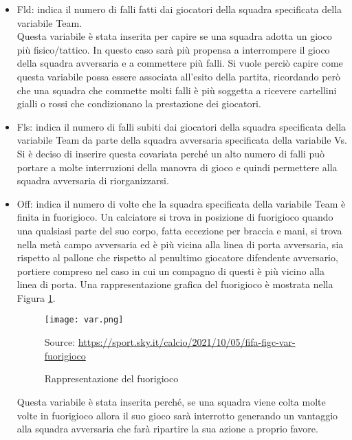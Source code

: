 \begin{itemize}
	\item \textsf{Fld}: indica il numero di falli fatti dai giocatori della squadra specificata della variabile \textsf{Team}. \\
	Questa variabile è stata inserita per capire se una squadra adotta un gioco più fisico/tattico. In questo caso sarà più propensa a interrompere il gioco della squadra avversaria e a commettere più falli. Si vuole perciò capire come questa variabile possa essere associata all'esito della partita, ricordando però che una squadra che commette molti falli è più soggetta a ricevere cartellini gialli o rossi che condizionano la prestazione dei giocatori.
	\item \textsf{Fls}: indica il numero di falli subiti dai giocatori della squadra specificata della variabile \textsf{Team} da parte della squadra avversaria specificata della variabile \textsf{Vs}. \\
	Si è deciso di inserire questa covariata perché un alto numero di falli può portare a molte interruzioni della manovra di gioco e quindi permettere alla squadra avversaria di riorganizzarsi.
	
	\item \textsf{Off}: indica il numero di volte che la squadra specificata della variabile \textsf{Team} è finita in fuorigioco. Un calciatore si trova in posizione di fuorigioco quando una qualsiasi parte del suo corpo, fatta eccezione per braccia e mani, si trova nella metà campo avversaria ed è più vicina alla linea di porta avversaria, sia rispetto al pallone che rispetto al penultimo giocatore difendente avversario, portiere compreso nel caso in cui un compagno di questi è più vicino alla linea di porta. Una rappresentazione grafica del fuorigioco è mostrata nella Figura \ref{fig:offside}.
	
	\begin{figure}[!ht]
		\begin{center}
			\texttt{[image: var.png]}
			
			\caption{Rappresentazione del fuorigioco} \label{fig:offside}
			Source: \url{https://sport.sky.it/calcio/2021/10/05/fifa-figc-var-fuorigioco}
		\end{center}
	\end{figure}
	
	Questa variabile è stata inserita perché, se una squadra viene colta molte volte in fuorigioco allora il suo gioco sarà interrotto generando un vantaggio alla squadra avversaria che farà ripartire la sua azione a proprio favore.
	
\end{itemize}

